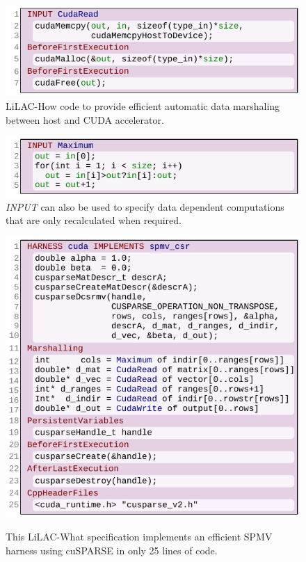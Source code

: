 \begin{figure}[t]
\centering
\includegraphics[width=0.944\linewidth]{figures/harness3.pdf}
\\[-0.75em]
\caption{LiLAC-How code to provide efficient automatic data marshaling between
         host and CUDA accelerator.}
\vspace{0.5em}
\label{cudaread}
\includegraphics[width=0.944\linewidth]{figures/harness4.pdf}
\\[-0.75em]
\caption{{\em INPUT} can also be used to specify data dependent computations
         that are only recalculated when required.}
\vspace{0.5em}
\label{readablemax}
\includegraphics[width=0.944\linewidth]{figures/harness1.pdf}
\\[-0.75em]
\caption{This LiLAC-What specification implements an efficient SPMV harness
  using cuSPARSE in only 25 lines of code.}
\label{spmvharness}
\end{figure}

